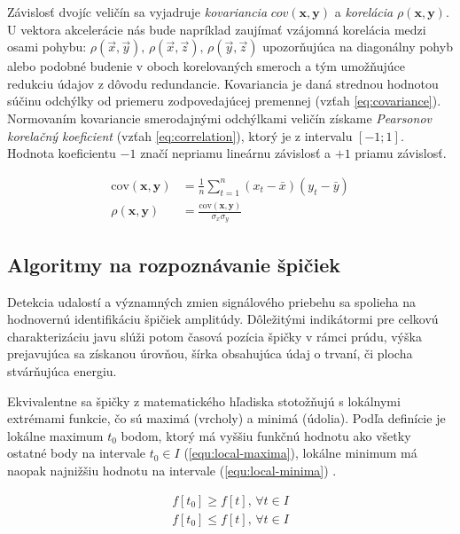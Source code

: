 Závislosť dvojíc veličín sa vyjadruje \emph{kovariancia} $cov(\mathbf{x}, \mathbf{y})$ a \emph{korelácia} 
$\rho(\mathbf{x}, \mathbf{y})$. U vektora akcelerácie nás bude napríklad zaujímať vzájomná korelácia medzi 
osami pohybu: $\rho(\vec{x},\vec{y}),\, \rho(\vec{x},\vec{z}),\, \rho(\vec{y},\vec{z})$ upozorňujúca na diagonálny 
pohyb alebo podobné budenie v oboch korelovaných smeroch a tým umožňujúce redukciu údajov z dôvodu redundancie.
Kovariancia je daná strednou hodnotou súčinu odchýlky od priemeru zodpovedajúcej premennej (vzťah \ref{eq:covariance}). 
Normovaním kovariancie smerodajnými odchýlkami veličín získame \emph{Pearsonov korelačný koeficient}
(vzťah \ref{eq:correlation}), ktorý je z intervalu $[-1; 1]$.  Hodnota koeficientu $-1$ značí nepriamu lineárnu závislosť
a $+1$ priamu závislosť. 
\begin{ceqn}\begin{align}
\mathrm{cov}(\mathbf{x}, \mathbf{y}) &= \frac{1}{n} \sum_{t=1}^{n}{(x_t - \bar{x})(y_t - \bar{y})} \label{eq:covariance} \\
\rho(\mathbf{x}, \mathbf{y}) &= \frac{\mathrm{cov}(\mathbf{x}, \mathbf{y})}{\sigma_x \sigma_y} \label{eq:correlation}
\end{align}\end{ceqn}

\subsection{Algoritmy na rozpoznávanie špičiek}
\label{peak-detection}
Detekcia udalostí a významných zmien signálového priebehu sa spolieha na hodnovernú identifikáciu špičiek amplitúdy.
Dôležitými indikátormi pre celkovú charakterizáciu javu slúži potom časová pozícia špičky v rámci prúdu, výška prejavujúca
sa získanou úrovňou, šírka obsahujúca údaj o trvaní, či plocha stvárňujúca energiu. 

Ekvivalentne sa špičky z matematického hľadiska stotožňujú s lokálnymi extrémami funkcie, čo sú maximá (vrcholy) a minimá (údolia). 
Podľa definície je lokálne maximum $t_0$ bodom, ktorý má vyššiu funkčnú hodnotu ako všetky ostatné body na intervale 
$t_0 \in I$ (\ref{equ:local-maxima}), lokálne minimum má naopak najnižšiu hodnotu na intervale (\ref{equ:local-minima}) 
\cite{survey-peaks-valleys}. 

\begin{ceqn}\begin{align}
f[t_0] \geq f[t],\, \forall t \in I \label{equ:local-maxima}\\
f[t_0] \leq f[t],\, \forall t \in I \label{equ:local-minima}
\end{align}\end{ceqn}

